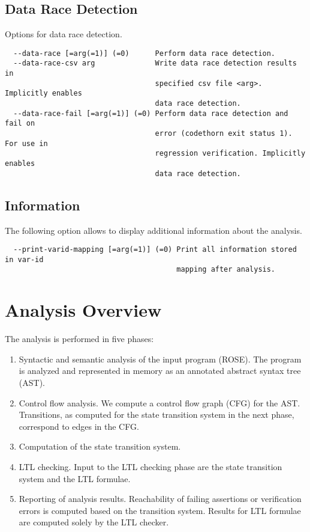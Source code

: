 \documentclass[natbib]{article}
\begin{document}
\subsection{Data Race Detection}
Options for data race detection.
\begin{verbatim}
  --data-race [=arg(=1)] (=0)      Perform data race detection.
  --data-race-csv arg              Write data race detection results in 
                                   specified csv file <arg>. Implicitly enables
                                   data race detection.
  --data-race-fail [=arg(=1)] (=0) Perform data race detection and fail on 
                                   error (codethorn exit status 1). For use in 
                                   regression verification. Implicitly enables 
                                   data race detection.
\end{verbatim}


\subsection{Information}
The following option allows to display additional information about the analysis.
\begin{verbatim}
  --print-varid-mapping [=arg(=1)] (=0) Print all information stored in var-id 
                                        mapping after analysis.

\end{verbatim}


\section{Analysis Overview}

The analysis is performed in five phases:

\begin{enumerate}
\item Syntactic and semantic analysis of the input program (ROSE). The program is analyzed and represented in memory as an annotated abstract syntax tree (AST).
\item Control flow analysis. We compute a control flow graph (CFG) for the AST. Transitions, as computed for the state transition system in the next phase, correspond to edges in the CFG.
\item Computation of the state transition system.
\item LTL checking. Input to the LTL checking phase are the state transition system and the LTL formulae.
\item Reporting of analysis results. Reachability of failing assertions or verification errors is computed based 
on the transition system. Results for LTL formulae are computed solely by the LTL checker.
\end{enumerate}
\end{document}
